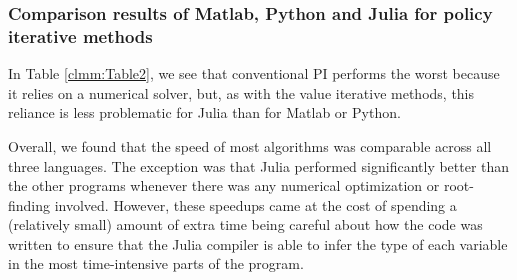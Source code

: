\subsubsection{Comparison results of Matlab, Python and Julia for policy iterative methods}

In Table \ref{clmm:Table2}, we see that conventional PI performs the worst because it relies on a
numerical solver, but, as with the value iterative methods, this reliance is less problematic for
Julia than for Matlab or Python.

Overall, we found that the speed of most algorithms was comparable across all three languages. The
exception was that Julia performed significantly better than the other programs whenever there was
any numerical optimization or root-finding involved. However, these speedups came at the cost of
spending a (relatively small) amount of extra time being careful about how the code was written to
ensure that the Julia compiler is able to infer the type of each variable in the most time-intensive
parts of the program.
